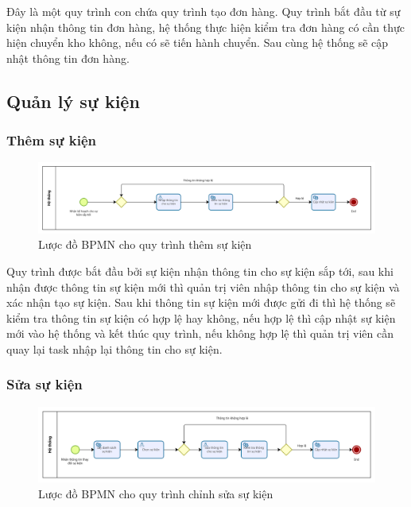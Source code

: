 Đây là một quy trình con chứa quy trình tạo đơn hàng. Quy trình bắt đầu từ sự kiện nhận thông tin đơn hàng, hệ thống thực hiện kiểm tra đơn hàng có cần thực hiện chuyển kho không, nếu có sẽ tiến hành chuyển. Sau cùng hệ thống sẽ cập nhật thông tin đơn hàng.


\subsection{Quản lý sự kiện}

\subsubsection{Thêm sự kiện}

\begin{figure}[!htp]
	\centering
	\includegraphics[width=14cm]{img/BPMN/event/add_event.png}
	\newline
	\caption{Lược đồ BPMN cho quy trình thêm sự kiện}
\end{figure}

Quy trình được bắt đầu bởi sự kiện nhận thông tin cho sự kiện sắp tới, sau khi nhận được thông tin sự kiện mới thì quản trị viên nhập thông tin cho sự kiện và xác nhận tạo sự kiện. Sau khi thông tin sự kiện mới được gửi đi thì hệ thống sẽ kiểm tra thông tin sự kiện có hợp lệ hay không, nếu hợp lệ thì cập nhật sự kiện mới vào hệ thống và kết thúc quy trình, nếu không hợp lệ thì quản trị viên cần quay lại task nhập lại thông tin cho sự kiện.

\newpage
\subsubsection{Sửa sự kiện}

\begin{figure}[!htp]
	\centering
	\includegraphics[width=14cm]{img/BPMN/event/edit_event.png}
	\newline
	\caption{Lược đồ BPMN cho quy trình chỉnh sửa sự kiện}
\end{figure}

